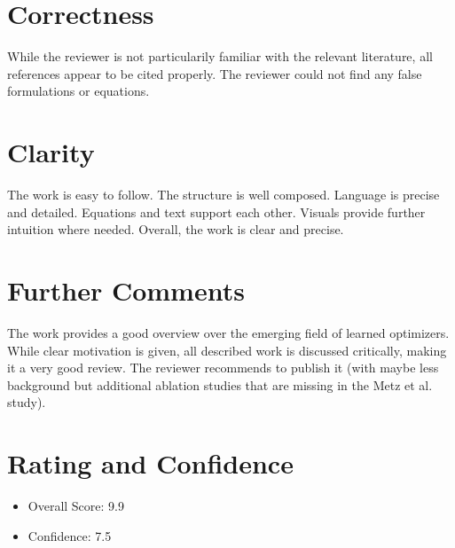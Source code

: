 \documentclass[a4paper]{scrartcl}
\begin{document}
\section*{Correctness}
While the reviewer is not particularily familiar with the relevant literature, all references appear to be cited properly. The reviewer could not find any false formulations or equations.

\section*{Clarity}
The work is easy to follow. The structure is well composed. Language is precise and detailed. Equations and text support each other. Visuals provide further intuition where needed. Overall, the work is clear and precise.

\section*{Further Comments}
The work provides a good overview over the emerging field of learned optimizers. While clear motivation is given, all described work is discussed critically, making it a very good review. The reviewer recommends to publish it (with maybe less background but additional ablation studies that are missing in the Metz et al. study).


\section*{Rating and Confidence}
\begin{itemize}
	\item Overall Score: 9.9
	\item Confidence: 7.5
\end{itemize}




	
\end{document}
